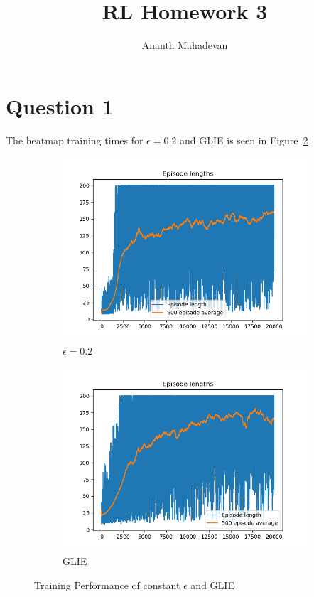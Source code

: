\documentclass[a4paper]{article}
\title{RL Homework 3}
\author{Ananth Mahadevan}
\begin{document}
\maketitle
\clearpage


\section*{Question 1}
The heatmap training times for $\epsilon=0.2$ and GLIE is seen in Figure~\ref{fig-training-cartpole}

\begin{figure}[h!]
    \centering
    \begin{subfigure}[b]{0.4\textwidth}
        \centering
        \includegraphics[width=\textwidth]{training_epsilon_0_2.png}
        \caption{$\epsilon=0.2$}
    \end{subfigure}
    \begin{subfigure}[b]{0.4\textwidth}
        \centering
        \includegraphics[width=\textwidth]{training_GLIE.png}
        \caption{GLIE}
        \label{fig-GLIE}
    \end{subfigure}
    \caption{Training Performance of constant $\epsilon$ and GLIE }
    \label{fig-training-cartpole}
\end{figure}
\end{document}
